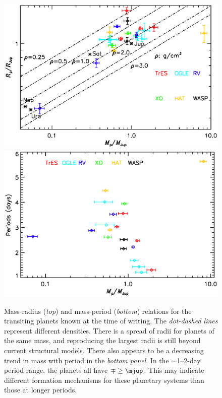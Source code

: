\begin{figure}
\begin{center}
\centering
\includegraphics[width=.90\textwidth]{1_radii}\\
\includegraphics[width=.90\textwidth]{1_periods}\\
\caption[Mass-radius and mass-period relations for transiting planets]{%
Mass-radius ({\it top}) and mass-period ({\it bottom}) relations for the transiting planets known at the time of writing.
The {\it dot-dashed lines} represent different densities.
There is a spread of radii for planets of the same mass, and reproducing the largest radii is still beyond current structural models.
There also appears to be a decreasing trend in mass with period in the {\it bottom panel}.
In the $\sim$1--2-day period range, the planets all have $\mp \geq \mjup$.
This may indicate different formation mechanisms for these planetary systems than those at longer periods.
}
\label{cha:intro:sec:methods:sub:trans:fig:tp}
\end{center}
\end{figure}

